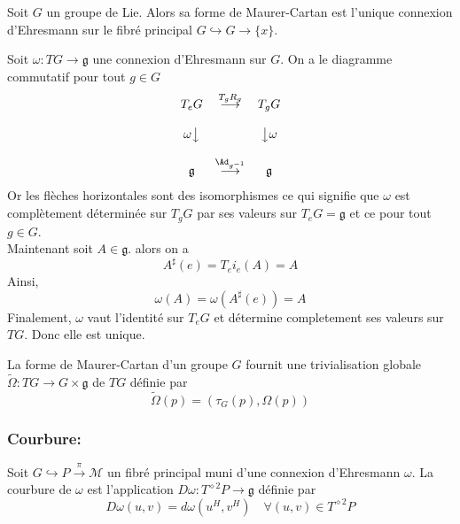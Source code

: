 \begin{pro}
Soit $G$ un groupe de Lie. Alors sa forme de Maurer-Cartan est l'unique connexion d'Ehresmann sur le fibré principal $G \hookrightarrow G \to \{x\}$.
\end{pro}
\begin{preu}
Soit $\omega: TG \to \mathfrak{g}$ une connexion d'Ehresmann sur $G$. On a le diagramme commutatif pour tout $g\in G$
$$\begin{matrix}
T_eG  & \overset{T_gR_{g}}{\longrightarrow} & T_gG \\ \\
\omega\big\downarrow &  & \big\downarrow\omega \\ \\
\mathfrak{g} & \overset{\Ad_{g^{-1}}}{\longrightarrow} & \mathfrak{g}
\end{matrix}
$$
Or les flèches horizontales sont des isomorphismes ce qui signifie que $\omega$ est complètement déterminée sur $T_gG$ par ses valeurs sur $T_eG = \mathfrak{g}$ et ce pour tout $g\in G$. \\
Maintenant soit $A\in \mathfrak{g}$. alors on a
$$A^\sharp(e) = T_ei_e(A) = A$$
Ainsi, 
$$\omega(A) = \omega(A^\sharp(e)) = A$$
Finalement, $\omega$ vaut l'identité sur $T_eG$ et détermine completement ses valeurs sur $TG$. Donc elle est unique.
\end{preu}


\begin{pro}
La forme de Maurer-Cartan d'un groupe $G$ fournit une trivialisation globale $\tilde{\Omega} : TG \to G\times \mathfrak{g}$ de $TG$ définie par
$$\tilde{\Omega}(p) = (\tau_G(p), \Omega(p))$$
\end{pro}

\subsubsection{Courbure:} 

\begin{defi}[Courbure]
Soit $G \hookrightarrow P \overset{\pi}{\to} \mathcal{M}$ un fibré principal muni d'une connexion d'Ehresmann $\omega$. La courbure de $\omega$ est l'application $D\omega : T^{\diamond 2}P \to \mathfrak{g}$ définie par 
$$D\omega(u,v) = d\omega(u^H, v^H) \quad \forall (u,v)\in T^{\diamond 2}P$$
\end{defi}

